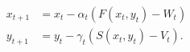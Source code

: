 \begin{equation}
    \begin{split}
        x_{t+1} &= x_t - \alpha_t \left(F(x_t, y_t) - W_t \right) \\ 
        y_{t+1} &= y_t - \gamma_t \left(S(x_t, y_t) - V_t \right) .
    \end{split}
    \label{eq:ttsa_general}
\end{equation}
